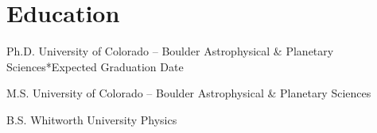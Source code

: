 \section{Education}

        {Ph.D.}
        {University of Colorado -- Boulder}
        {Astrophysical \& Planetary Sciences}{}{*Expected Graduation Date}

        {M.S.}
        {University of Colorado -- Boulder}
        {Astrophysical \& Planetary Sciences}{}{}

        {B.S.}
        {Whitworth University}
        {Physics}{}{}
